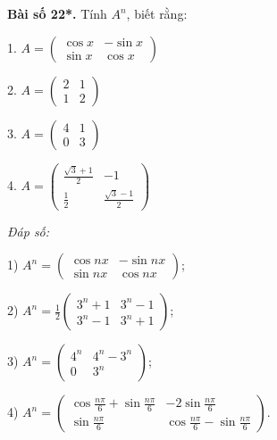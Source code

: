         \textbf{Bài số 22*.} Tính \(A^n\), biết rằng:
        
        1.
        \(
        A = \begin{pmatrix}
        \cos x & -\sin x \\
        \sin x & \cos x
        \end{pmatrix}
        \)
        
        2.
        \(
        A = \begin{pmatrix}
        2 & 1 \\
        1 & 2
        \end{pmatrix}
        \)
        
        3.
        \(
        A = \begin{pmatrix}
        4 & 1 \\
        0 & 3
        \end{pmatrix}
        \)
        
        4.
        \(
        A = \begin{pmatrix}
        \frac{\sqrt{3} + 1}{2} & -1 \\
        \frac{1}{2} & \frac{\sqrt{3} - 1}{2}
        \end{pmatrix}
        \)
        
        \textit{Đáp số:}

        1) \(A^n = \begin{pmatrix}
        \cos nx & -\sin nx \\
        \sin nx & \cos nx
        \end{pmatrix}\);
        
        2) \(A^n = \frac{1}{2} \begin{pmatrix}
        3^n + 1 & 3^n - 1 \\
        3^n - 1 & 3^n + 1
        \end{pmatrix}\);
        
        3) \(A^n = \begin{pmatrix}
        4^n & 4^n - 3^n \\
        0 & 3^n
        \end{pmatrix}\);
        
        4) \(A^n = \begin{pmatrix}
        \cos \frac{n\pi}{6} + \sin \frac{n\pi}{6} & -2\sin \frac{n\pi}{6} \\
        \sin \frac{n\pi}{6} & \cos \frac{n\pi}{6} - \sin \frac{n\pi}{6}
        \end{pmatrix}\).
        
